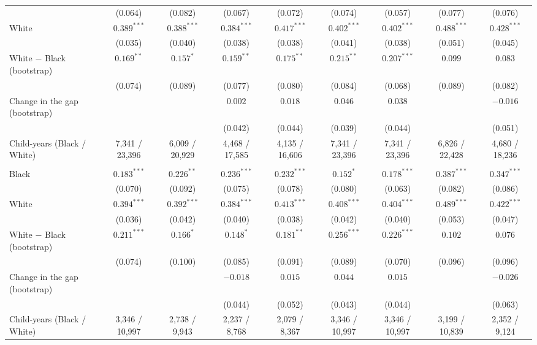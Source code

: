 \begin{table}[!htbp]
{{\begin{tabular}{lcccccccc}
 & (0.064) & (0.082) & (0.067) & (0.072) & (0.074) & (0.057) & (0.077) & (0.076) \\
White & $0.389^{***}$ & $0.388^{***}$ & $0.384^{***}$ & $0.417^{***}$ & $0.402^{***}$ & $0.402^{***}$ & $0.488^{***}$ & $0.428^{***}$ \\
 & (0.035) & (0.040) & (0.038) & (0.038) & (0.041) & (0.038) & (0.051) & (0.045) \\
White $-$ Black (bootstrap) & $0.169^{**}$ & $0.157^{*}$ & $0.159^{**}$ & $0.175^{**}$ & $0.215^{**}$ & $0.207^{***}$ & $0.099$ & $0.083$ \\
 & (0.074) & (0.089) & (0.077) & (0.080) & (0.084) & (0.068) & (0.089) & (0.082) \\
Change in the gap (bootstrap) &  &  & $0.002$ & $0.018$ & $0.046$ & $0.038$ &  & $-0.016$ \\
 &  &  & (0.042) & (0.044) & (0.039) & (0.044) &  & (0.051) \\
Child-years (Black / White) & 7,341 / 23,396 & 6,009 / 20,929 & 4,468 / 17,585 & 4,135 / 16,606 & 7,341 / 23,396 & 7,341 / 23,396 & 6,826 / 22,428 & 4,680 / 18,236 \\
\addlinespace
\multicolumn{9}{l}{\textit{B. Sons 35--55, IGE at age 40}} \\
Black & $0.183^{***}$ & $0.226^{**}$ & $0.236^{***}$ & $0.232^{***}$ & $0.152^{*}$ & $0.178^{***}$ & $0.387^{***}$ & $0.347^{***}$ \\
 & (0.070) & (0.092) & (0.075) & (0.078) & (0.080) & (0.063) & (0.082) & (0.086) \\
White & $0.394^{***}$ & $0.392^{***}$ & $0.384^{***}$ & $0.413^{***}$ & $0.408^{***}$ & $0.404^{***}$ & $0.489^{***}$ & $0.422^{***}$ \\
 & (0.036) & (0.042) & (0.040) & (0.038) & (0.042) & (0.040) & (0.053) & (0.047) \\
White $-$ Black (bootstrap) & $0.211^{***}$ & $0.166^{*}$ & $0.148^{*}$ & $0.181^{**}$ & $0.256^{***}$ & $0.226^{***}$ & $0.102$ & $0.076$ \\
 & (0.074) & (0.100) & (0.085) & (0.091) & (0.089) & (0.070) & (0.096) & (0.096) \\
Change in the gap (bootstrap) &  &  & $-0.018$ & $0.015$ & $0.044$ & $0.015$ &  & $-0.026$ \\
 &  &  & (0.044) & (0.052) & (0.043) & (0.044) &  & (0.063) \\
Child-years (Black / White) & 3,346 / 10,997 & 2,738 / 9,943 & 2,237 / 8,768 & 2,079 / 8,367 & 3,346 / 10,997 & 3,346 / 10,997 & 3,199 / 10,839 & 2,352 / 9,124 \\

\end{tabular}}}
\end{table}
